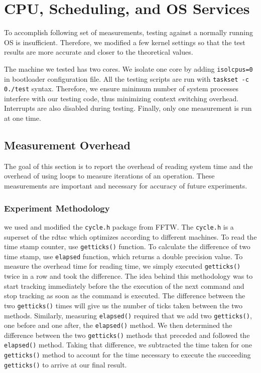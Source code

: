 \documentclass{article} %
\begin{document}
\section{CPU, Scheduling, and OS Services}

To accomplish following set of measurements, testing against a normally
running OS is insufficient. Therefore, we modified a few kernel settings so
that the test results are more accurate and closer to the theoretical values.

The machine we tested has two cores. We isolate one core by adding
\texttt{isolcpus=0} in bootloader configuration file. All the testing scripts
are run with \texttt{taskset -c 0\space./test} syntax. Therefore, we ensure minimum
number of system processes interfere with our testing code, thus minimizing
context switching overhead. Interrupts are also disabled during testing.
Finally, only one measurement is run at one time.

\subsection{Measurement Overhead}
The goal of this section is to report the overhead of reading system time and
the overhead of using loops to measure iterations of an operation.  These
measurements are important and necessary for accuracy of future experiments.

\subsubsection{Experiment Methodology}
we used and modified the \texttt{cycle.h} package from FFTW\cite{FFTW}.  The
\texttt{cycle.h} is a superset of the rdtsc which optimizes according to
different machines.  To read the time stamp counter, use \texttt{getticks()}
function. To calculate the difference of two time stamp, use \texttt{elapsed}
function, which returns a double precision value.  To measure the overhead
time for reading time, we simply executed \texttt{getticks()} twice in a row
and took the difference. The idea behind this methodology was to start
tracking immediately before the the execution of the next command and stop
tracking as soon as the command is executed. The difference between the two
\texttt{getticks()} times will give us the number of ticks taken between the
two methods. Similarly, measuring \texttt{elapsed()} required that we add two
\texttt{getticks()}, one before and one after, the \texttt{elapsed()} method.
We then determined the difference between the two \texttt{getticks()} methods
that preceded and followed the \texttt{elapsed()} method. Taking that
difference, we subtracted the time taken for one \texttt{getticks()} method to
account for the time necessary to execute the succeeding \texttt{getticks()}
to arrive at our final result.
\end{document}
